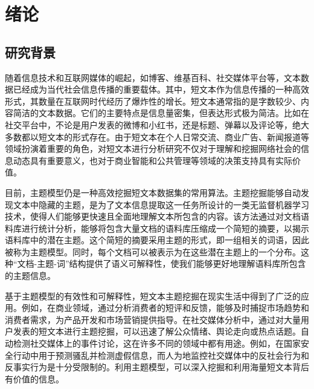 \chapter{绪论}\label{chap:intro}

\section{研究背景}\label{sec:background}
随着信息技术和互联网媒体的崛起，如博客、维基百科、社交媒体平台等，文本数据已经成为当代社会信息传播的重要载体。其中，短文本作为信息传播的一种高效形式，其数量在互联网时代经历了爆炸性的增长。短文本通常指的是字数较少、内容简洁的文本数据。它们的主要特点是信息量密集，但表达形式极为简洁。比如在社交平台中，不论是用户发表的微博和小红书，还是标题、弹幕以及评论等，绝大多数都以短文本的形式存在。由于短文本在个人日常交流、商业广告、新闻报道等领域扮演着重要的角色，对短文本进行分析研究不仅对于理解和挖掘网络社会的信息动态具有重要意义，也对于商业智能和公共管理等领域的决策支持具有实际价值。

目前，主题模型仍是一种高效挖掘短文本数据集的常用算法。主题挖掘能够自动发现文本中隐藏的主题，是为了文本信息提取这一任务所设计的一类无监督机器学习技术，使得人们能够更快速且全面地理解文本所包含的内容。该方法通过对文档语料库进行统计分析，能够将包含大量文档的语料库压缩成一个简短的摘要，以揭示语料库中的潜在主题。这个简短的摘要采用主题的形式，即一组相关的词语，因此被称为主题模型。同时，每个文档可以被表示为在这些潜在主题上的一个分布。这种“文档-主题-词”结构提供了语义可解释性，使我们能够更好地理解语料库所包含的主题信息。

基于主题模型的有效性和可解释性，短文本主题挖掘在现实生活中得到了广泛的应用。例如，在商业领域，通过分析消费者的短评和反馈，能够及时捕捉市场趋势和消费者需求，为产品开发和市场营销提供指导。在社交媒体分析中，通过对大量用户发表的短文本进行主题挖掘，可以迅速了解公众情绪、舆论走向或热点话题。自动检测社交媒体上的事件讨论，这在许多不同的领域中都有用途。例如，在国家安全行动中用于预测骚乱并检测虚假信息\cite{DisruptiveEventDetection}，而人为地监控社交媒体中的反社会行为和反事实行为是十分受限制的。利用主题模型，可以深入挖掘和利用海量短文本背后有价值的信息。
    
